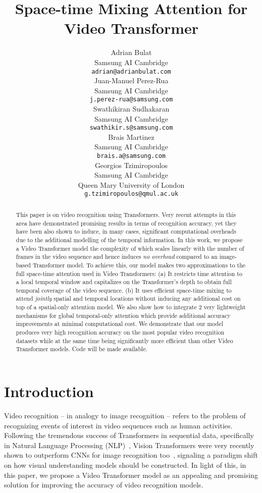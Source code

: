 \documentclass{article}
\title{Space-time Mixing Attention for Video Transformer}
\author{Adrian Bulat \\
  Samsung AI Cambridge\\
  \texttt{adrian@adrianbulat.com} \\
\And
   Juan-Manuel Perez-Rua \\
   Samsung AI Cambridge \\
   \texttt{j.perez-rua@samsung.com} \\
   \AND
   Swathikiran Sudhakaran \\
   Samsung AI Cambridge \\
   \texttt{swathikir.s@samsung.com} \\
   \And
   Brais Martinez \\
   Samsung AI Cambridge \\
   \texttt{brais.a@samsung.com} \\
   \And
   Georgios Tzimiropoulos \\
   Samsung AI Cambridge \\
   Queen Mary University of London\\
   \texttt{g.tzimiropoulos@qmul.ac.uk} \\
}
\begin{document}
\maketitle

\begin{abstract}

This paper is on video recognition using Transformers. Very recent attempts in this area have demonstrated promising results in terms of recognition accuracy, yet they have been also shown to induce, in many cases, significant computational overheads due to the additional modelling of the temporal information. In this work, we propose a Video Transformer model the complexity of which scales linearly with the number of frames in the video sequence and hence induces \textit{no overhead} compared to an image-based Transformer model. To achieve this, our model makes two approximations to the full space-time attention used in Video Transformers: (a) It restricts time attention to a local temporal window and capitalizes on the Transformer's depth to obtain full temporal coverage of the video sequence. (b) It uses efficient space-time mixing to attend \textit{jointly} spatial and temporal locations without inducing any additional cost on top of a spatial-only attention model. We also show how to integrate 2 very lightweight mechanisms for global temporal-only attention which provide additional accuracy improvements at minimal computational cost. We demonstrate that our model produces very high recognition accuracy on the most popular video recognition datasets while at the same time being significantly more efficient than other Video Transformer models. Code will be made available.

\end{abstract}

\section{Introduction}

Video recognition -- in analogy to image recognition -- refers to the problem of recognizing events of interest in video sequences such as human activities. Following the tremendous success of Transformers in sequential data, specifically in Natural Language Processing (NLP)~\citep{vaswani2017attention,chen2018best}, Vision Transformers were very recently shown to outperform CNNs for image recognition too~\citep{yuan2021tokens,dosovitskiy2020image,touvron2020training}, signaling a paradigm shift on how visual understanding models should be constructed. In light of this, in this paper, we propose a Video Transformer model as an appealing and promising solution for improving the accuracy of video recognition models. 
\end{document}
